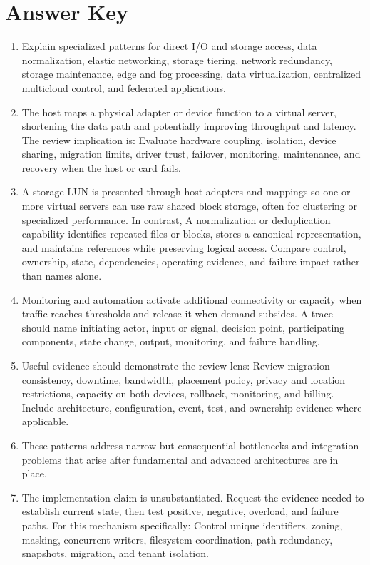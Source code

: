 \documentclass[11pt]{article}
\begin{document}
\section{Answer Key}
\begin{enumerate}
\item Explain specialized patterns for direct I/O and storage access, data normalization, elastic networking, storage tiering, network redundancy, storage maintenance, edge and fog processing, data virtualization, centralized multicloud control, and federated applications.
\item The host maps a physical adapter or device function to a virtual server, shortening the data path and potentially improving throughput and latency. The review implication is: Evaluate hardware coupling, isolation, device sharing, migration limits, driver trust, failover, monitoring, maintenance, and recovery when the host or card fails.
\item A storage LUN is presented through host adapters and mappings so one or more virtual servers can use raw shared block storage, often for clustering or specialized performance. In contrast, A normalization or deduplication capability identifies repeated files or blocks, stores a canonical representation, and maintains references while preserving logical access. Compare control, ownership, state, dependencies, operating evidence, and failure impact rather than names alone.
\item Monitoring and automation activate additional connectivity or capacity when traffic reaches thresholds and release it when demand subsides. A trace should name initiating actor, input or signal, decision point, participating components, state change, output, monitoring, and failure handling.
\item Useful evidence should demonstrate the review lens: Review migration consistency, downtime, bandwidth, placement policy, privacy and location restrictions, capacity on both devices, rollback, monitoring, and billing. Include architecture, configuration, event, test, and ownership evidence where applicable.
\item These patterns address narrow but consequential bottlenecks and integration problems that arise after fundamental and advanced architectures are in place.
\item The implementation claim is unsubstantiated. Request the evidence needed to establish current state, then test positive, negative, overload, and failure paths. For this mechanism specifically: Control unique identifiers, zoning, masking, concurrent writers, filesystem coordination, path redundancy, snapshots, migration, and tenant isolation.

\end{enumerate}
\end{document}
